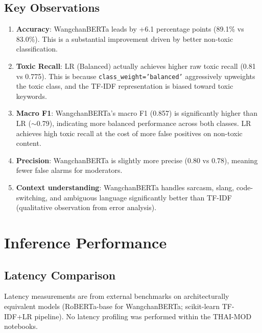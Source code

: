 \documentclass[11pt,a4paper]{article}
\begin{document}
\subsection{Key Observations}

\begin{enumerate}
    \item \textbf{Accuracy}: WangchanBERTa leads by +6.1 percentage points (89.1\% vs 83.0\%).
          This is a substantial improvement driven by better non-toxic classification.

    \item \textbf{Toxic Recall}: LR (Balanced) actually achieves higher raw toxic recall (0.81 vs 0.775).
          This is because \texttt{class\_weight='balanced'} aggressively upweights the toxic class,
          and the TF-IDF representation is biased toward toxic keywords.

    \item \textbf{Macro F1}: WangchanBERTa's macro F1 (0.857) is significantly higher than LR ($\sim$0.79),
          indicating more balanced performance across both classes. LR achieves high toxic recall
          at the cost of more false positives on non-toxic content.

    \item \textbf{Precision}: WangchanBERTa is slightly more precise (0.80 vs 0.78), meaning fewer
          false alarms for moderators.

    \item \textbf{Context understanding}: WangchanBERTa handles sarcasm, slang, code-switching, and
          ambiguous language significantly better than TF-IDF (qualitative observation from error analysis).
\end{enumerate}

\section{Inference Performance}

\subsection{Latency Comparison}

Latency measurements are from external benchmarks on architecturally equivalent models
(RoBERTa-base for WangchanBERTa; scikit-learn TF-IDF+LR pipeline).
No latency profiling was performed within the THAI-MOD notebooks.
\end{document}
